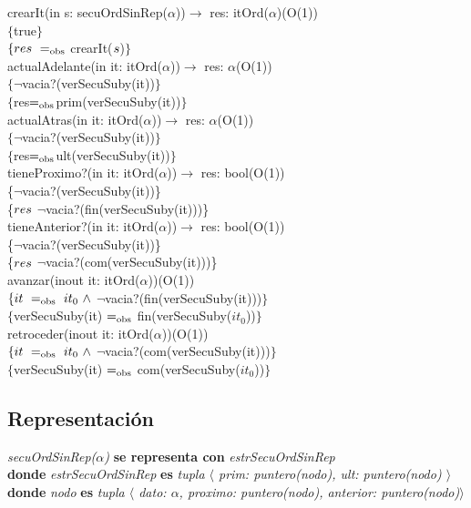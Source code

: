 crearIt(in s: secuOrdSinRep($\alpha$))$\longrightarrow$ res: itOrd($\alpha$)\hfill (O(1))\\
$\{$true$\}$\\
$\{{res}\ =_{\mathrm{obs}}$ crearIt(${s}$)$\}$\\

actualAdelante(in it: itOrd($\alpha$))$\longrightarrow$ res: $\alpha$\hfill (O(1))\\
$\{\neg$vacia?(verSecuSuby(it))$\}$\\
$\{ $res$ =_{\mathrm{obs}} $prim(verSecuSuby(it))$\}$\\

actualAtras(in it: itOrd($\alpha$))$\longrightarrow$ res: $\alpha$\hfill (O(1))\\
$\{\neg$vacia?(verSecuSuby(it))$\}$\\
$\{ $res$ =_{\mathrm{obs}} $ult(verSecuSuby(it))$\}$\\

tieneProximo?(in it: itOrd($\alpha$))$\longrightarrow$ res: bool\hfill (O(1))\\
\{$\neg$vacia?(verSecuSuby(it))\}\\
\{${res}$ \igobs $\neg$vacia?(fin(verSecuSuby(it)))\}\\

tieneAnterior?(in it: itOrd($\alpha$))$\longrightarrow$ res: bool\hfill (O(1))\\
\{$\neg$vacia?(verSecuSuby(it))\}\\
\{${res}$ \igobs $\neg$vacia?(com(verSecuSuby(it)))\}\\

avanzar(inout it: itOrd($\alpha$))\hfill (O(1))\\
$\{\sombreritoWide{it}\ \igobs\ it_0\ \wedge$ $\neg$vacia?(fin(verSecuSuby(it)))$\}$\\
$\{$verSecuSuby(it) $=_{\mathrm{obs}}$ fin(verSecuSuby($it_0$))$\}$\\

retroceder(inout it: itOrd($\alpha$))\hfill (O(1))\\
$\{\sombreritoWide{it}\ \igobs\ it_0\ \wedge$ $\neg$vacia?(com(verSecuSuby(it)))$\}$\\
$\{$verSecuSuby(it) $=_{\mathrm{obs}}$ com(verSecuSuby($it_0$))$\}$\\


\subsection*{Representaci\'on}
\textit{secuOrdSinRep($\alpha$)} \textbf{se representa con} \textit{estrSecuOrdSinRep}\\
\textbf{donde} \textit{estrSecuOrdSinRep} \textbf{es} \textit{tupla $\langle$ prim: puntero(nodo), ult: puntero(nodo) $\rangle$}\\
\textbf{donde} \textit{nodo} \textbf{es} \textit{tupla $\langle$ dato: $\alpha$, proximo: puntero(nodo), anterior: puntero(nodo)$\rangle$}\\

